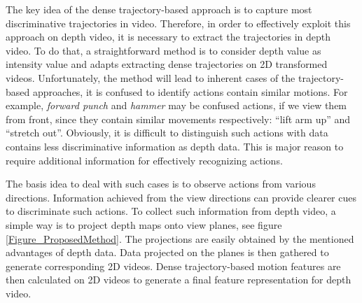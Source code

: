 \documentclass[final,3p,times,twocolumn]{elsarticle}
\begin{document}
The key idea of the dense trajectory-based approach is to capture most discriminative trajectories in video.
Therefore, in order to effectively exploit this approach on depth video, it is necessary to extract the trajectories in depth video.
To do that, a straightforward method is to consider depth value as intensity value and adapts extracting dense trajectories on 2D transformed videos.
Unfortunately, the method will lead to inherent cases of the trajectory-based approaches, it is confused to identify actions contain similar motions.
For example, \textit{forward punch} and \textit{hammer} may be confused actions, if we view them from front, since they contain similar movements respectively: ``lift arm up'' and ``stretch out''.
Obviously, it is difficult to distinguish such actions with data contains less discriminative information as depth data.
This is major reason to require additional information for effectively recognizing actions.


The basis idea to deal with such cases is to observe actions from various directions.
Information achieved from the view directions can provide clearer cues to discriminate such actions.
To collect such information from depth video, a simple way is to project depth maps onto view planes, see figure \ref{Figure_ProposedMethod}.
The projections are easily obtained by the mentioned advantages of depth data.
Data projected on the planes is then gathered to generate corresponding 2D videos.
Dense trajectory-based motion features are then calculated on 2D videos to generate a final feature representation for depth video.
\end{document}
